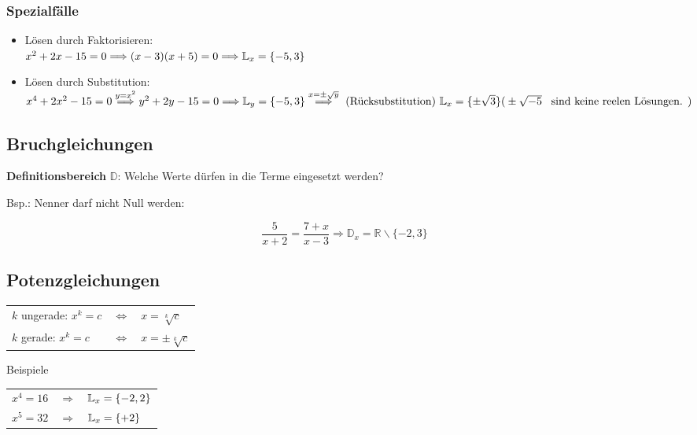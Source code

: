 \begin{multicols}{2}
\subsubsection*{Spezialfälle}
\begin{itemize}
\item Lösen durch Faktorisieren:\\
$x^2+2x-15=0 \Longrightarrow (x-3)(x+5)=0 \Longrightarrow \mathbb{L}_x=\{-5,3\}$

\item Lösen durch Substitution:\\
$x^4+2x^2-15=0 \stackrel{y=x^2}{\Longrightarrow}\\
y^2+2y-15=0 \Longrightarrow \mathbb{L}_y=\{-5,3\} \stackrel{x=\pm{}\sqrt{y}}{\Longrightarrow}
\textrm{ (Rücksubstitution) } \mathbb{L}_x=\{\pm\sqrt{3}\}\\
\textrm{(} \pm\sqrt{-5} \textrm{ \, sind keine reelen Lösungen. )}$

\end{itemize}

\subsection*{Bruchgleichungen}

\textbf{Definitionsbereich} $\mathbb{D}$: Welche Werte dürfen in die Terme eingesetzt werden?

Bsp.: Nenner darf nicht Null werden:

$$\frac5{x+2}=\frac{7+x}{x-3} \Rightarrow{} \mathbb{D}_x=\mathbb{R}\backslash{}\{-2, 3\}$$

\subsection*{Potenzgleichungen}


\begin{tabular}{lcl}
$k$ ungerade: $x^k=c$ & $\Leftrightarrow$ & $x=\sqrt[k]{c}$\\
$k$ gerade:   $x^k=c$ & $\Leftrightarrow$ & $x=\pm\sqrt[k]{c}$\\
\end{tabular}

Beispiele

\begin{tabular}{rcl}
$x^4=16$ & $\Longrightarrow$ & $\mathbb{L}_x=\{-2, 2\}  $ \\
$x^5=32$ & $\Longrightarrow$ & $\mathbb{L}_x=\{+2\}  $ \\


\end{tabular}
\end{multicols}
